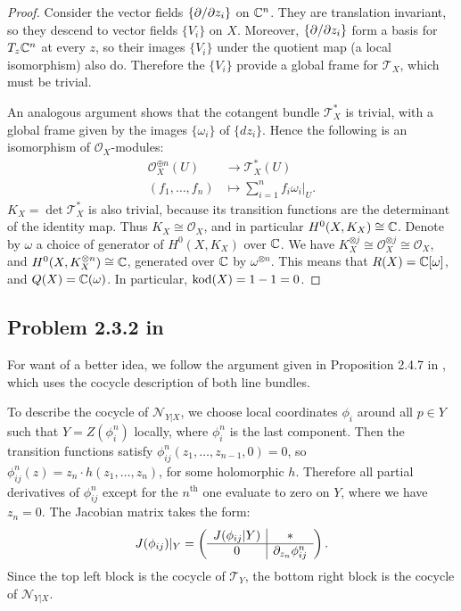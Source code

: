 \documentclass{article}
\begin{document}
\begin{proof}
Consider the vector fields $\{\partial/\partial z_i\}$ on $\mathbb{C}^n$. They are translation invariant, so they descend to
vector fields $\{V_i\}$ on $X$. Moreover, $\{\partial/\partial z_i\}$ form a basis for $T_z\mathbb{C}^n$ at every $z$, so their
images $\{V_i\}$ under the quotient map (a local isomorphism) also do. Therefore the $\{V_i\}$ provide
a global frame for $\mathcal{T}_X$, which must be trivial.

An analogous argument shows that the cotangent bundle $\mathcal{T}^*_X$ is trivial, with a global frame
given by the images $\{\omega_i\}$ of $\{dz_i\}$. Hence the following is an isomorphism of $\mathcal{O}_X$-modules:
\begin{align*}
\mathcal{O}_X^{\oplus n}(U) &\to \mathcal{T}^*_X(U) \\
(f_1, \dots, f_n) &\mapsto \sum_{i=1}^n f_i \omega_i|_U.
\end{align*}
$K_X = \det \mathcal{T}^*_X$ is also trivial, because its transition functions are the determinant of the
identity map. Thus $K_X \cong \mathcal{O}_X$, and in particular $H^0(X, K_X) \cong \mathbb{C}$. Denote by $\omega$ a
choice of generator of $H^0(X, K_X)$ over $\mathbb{C}$. We have $K_X^{\otimes j} \cong \mathcal{O}_X^{\otimes j} \cong
\mathcal{O}_X$, and $H^0(X, K_X^{\otimes n}) \cong \mathbb{C}$, generated over $\mathbb{C}$ by $\omega^{\otimes n}$. This means
that $R(X) = \mathbb{C}[\omega]$, and $Q(X) = \mathbb{C}(\omega)$. In particular, $\operatorname{kod}(X) = 1 - 1 = 0$.
\end{proof}


\subsection*{Problem 2.3.2 in \cite{Huy}}
For want of a better idea, we follow the argument given in Proposition 2.4.7 in \cite{Huy}, which uses the cocycle
description of both line bundles.

To describe the cocycle of $\mathcal{N}_{Y|X}$, we choose local coordinates $\phi_i$ around all $p \in Y$ such that
$Y = Z(\phi^n_i)$ locally, where $\phi^n_i$ is the last component. Then the transition functions satisfy
$\phi_{ij}^n(z_1, \dots, z_{n-1}, 0) = 0$, so $\phi^n_{ij}(z) = z_n \cdot h(z_1, \dots, z_n)$, for some holomorphic
$h$. Therefore all partial derivatives of $\phi^n_{ij}$ except for the $n^{\text{th}}$ one evaluate to zero
on $Y$, where we have $z_n = 0$. The Jacobian matrix takes the form:
\[
J(\phi_{ij})|_Y = \left( \begin{array} {c|c}
J(\phi_{ij}|Y) & * \\ \hline
0 & \partial_{z_n} \phi^n_{ij}
\end{array} \right) .
\]
Since the top left block is the cocycle of $\mathcal{T}_Y$, the bottom right block is the cocycle of $\mathcal{N}
_{Y|X}$.
\end{document}
